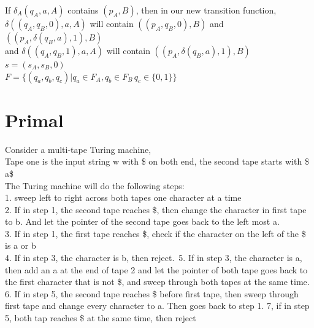 \documentclass[12pt]{article}
\begin{document}
If $\delta_A(q_A,a,A)$ contains $(p_A, B)$, then in our new transition function,\\
$\delta((q_A,q_B,0),a,A)$ will contain $((p_A,q_B,0),B)$ and $((p_A,\delta(q_B,a),1),B)$\\
and $\delta((q_A,q_B,1),a,A)$ will contain $((p_A,\delta(q_B,a),1),B)$\\

$s = (s_A,s_B,0)$\\
$F = \{(q_a,q_b,q_c) | q_a \in F_A, q_b\in F_B\, q_c\in \{0,1\}\}$

\pagebreak
\section{Primal}

Consider a multi-tape Turing machine,\\
Tape one is the input string w with \$ on both end, the second tape starts with \$ a\$ \\ 

The Turing machine will do the following steps:\\
1. sweep left to right across both tapes one character at a time\\
2. If in step 1, the second tape reaches \$, then change the character in first tape to b. And let the pointer of the second tape goes back to the left most a.\\
3. If in step 1, the first tape reaches \$, check if the character on the left of the \$ is a or b\\
4. If in step 3, the character is b, then reject.\
5. If in step 3, the character is a, then add an a at the end of tape 2 and let the pointer of both tape goes back to the first character that is not \$, and sweep through both tapes at the same time.
6. If in step 5, the second tape reaches \$ before first tape, then sweep through first tape and change every character to a. Then goes back to step 1.
7, if in step 5, both tap reaches \$ at the same time, then reject
\end{document}
